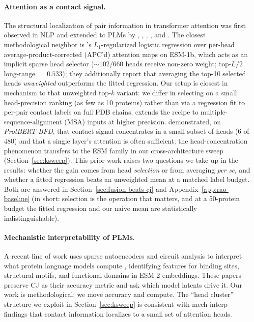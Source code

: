 \documentclass{article}
\begin{document}
\paragraph{Attention as a contact signal.}
The structural localization of pair information in transformer
attention was first observed in NLP \citep{vig2019bertattention,clark2019bertlookat}
and extended to PLMs by \citet{vig2021bertology}, \citet{bepler2019contact},
\citet{rao2021transformerplm}, \citet{rao2021msa}, and
\citet{bhattacharya2021attention}. The closest methodological neighbor
is \citeauthor{rao2021transformerplm}'s $L_1$-regularized logistic
regression over per-head average-product-corrected (APC'd) attention maps on ESM-1b, which acts
as an implicit sparse head selector ($\sim 102/660$ heads receive
non-zero weight; top-$L/2$ long-range $= 0.533$); they additionally
report that averaging the top-10 selected heads \emph{unweighted}
outperforms the fitted regression. Our setup is closest in mechanism
to that unweighted top-$k$ variant: we differ in selecting on a
small head-precision ranking (as few as 10 proteins) rather than via a
regression fit to per-pair contact labels on full PDB chains. \citet{rao2021msa}
extends the recipe to multiple-sequence-alignment (MSA) inputs at higher precision.
\citet{bhattacharya2021attention} demonstrated, on \emph{ProtBERT-BFD},
that contact signal concentrates in a small subset of heads (6 of
480) and that a single layer's attention is often sufficient; the
head-concentration phenomenon transfers to the ESM family in our
cross-architecture sweep (Section~\ref{sec:ksweep}).
This prior work raises two questions we take up in the results: whether
the gain comes from head \emph{selection} or from averaging \emph{per
se}, and whether a fitted regression beats an unweighted mean at a
matched label budget. Both are answered in
Section~\ref{sec:fusion-beats-cj} and Appendix~\ref{app:rao-baseline}
(in short: selection is the operation that matters, and at a 50-protein
budget the fitted regression and our naive mean are statistically
indistinguishable).

\paragraph{Mechanistic interpretability of PLMs.}
A recent line of work uses sparse autoencoders and circuit analysis
to interpret what protein language models compute
\citep{adams2025plmsae,simon2025interplm}, identifying features for
binding sites, structural motifs, and functional domains in ESM-2
embeddings. These papers preserve CJ as their accuracy metric and
ask which model latents drive it. Our work is methodological: we
move accuracy and compute. The ``head cluster'' structure we exploit
in Section~\ref{sec:ksweep} is consistent with mech-interp findings
that contact information localizes to a small set of attention heads.
\end{document}
